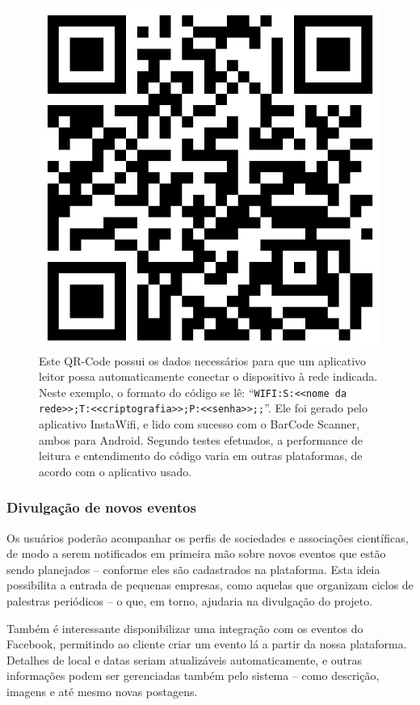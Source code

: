\documentclass[12pt,a4paper,twoside,hyphens,english,brazil]{abntex2}
\begin{document}
\begin{figure}
	\centering
	\includegraphics[width=0.27\linewidth]{imagens/qr-wifi}
	\protect\caption[QR-Code com dados da rede Wi-Fi]{Este QR-Code possui os dados necessários para que um aplicativo leitor possa automaticamente conectar o dispositivo à rede indicada. Neste exemplo, o formato do código se lê: ``\texttt{WIFI:S:<<nome da rede>>;T:<<criptografia>>;P:<<senha>>;;}''. Ele foi gerado pelo aplicativo InstaWifi\cite{instawifi}, e lido com sucesso com o BarCode Scanner\cite{barcode}, ambos para Android. Segundo testes efetuados, a performance de leitura e entendimento do código varia em outras plataformas, de acordo com o aplicativo usado.}
	\label{fig:qr-wifi}
\end{figure}

\subsubsection*{Divulgação de novos eventos}
Os usuários poderão acompanhar os perfis de sociedades e associações científicas, de modo a serem notificados em primeira mão sobre novos eventos que estão sendo planejados -- conforme eles são cadastrados na plataforma.
Esta ideia possibilita a entrada de pequenas empresas, como aquelas que organizam ciclos de palestras periódicos -- o que, em torno, ajudaria na divulgação do projeto.

Também é interessante disponibilizar uma integração com os eventos do Facebook, permitindo ao cliente criar um evento lá a partir da nossa plataforma. Detalhes de local e datas seriam atualizáveis automaticamente, e outras informações podem ser gerenciadas também pelo sistema -- como descrição, imagens e até mesmo novas postagens.
\end{document}
